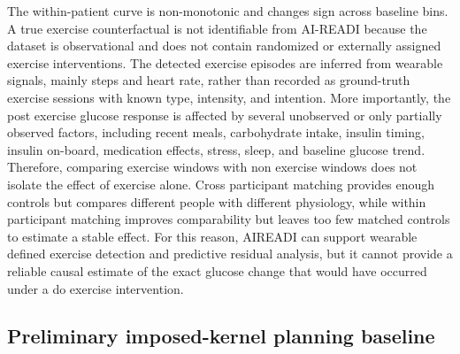 The within-patient curve is non-monotonic and changes sign across baseline
bins. A true exercise counterfactual is not identifiable from AI-READI because the dataset is observational and does not contain randomized or externally assigned exercise interventions. The detected exercise episodes are inferred from wearable signals, mainly steps and heart rate, rather than recorded as ground-truth exercise sessions with known type, intensity, and intention. More importantly, the post exercise glucose response is affected by several unobserved or only partially observed factors, including recent meals, carbohydrate intake, insulin timing, insulin on-board, medication effects, stress, sleep, and baseline glucose trend. Therefore, comparing exercise windows with non exercise windows does not isolate the effect of exercise alone. Cross participant matching provides enough controls but compares different people with different physiology, while within participant matching improves comparability but leaves too few matched controls to estimate a stable effect. For this reason, AIREADI can support wearable defined exercise detection and predictive residual analysis, but it cannot provide a reliable causal estimate of the exact glucose change that would have occurred under a do exercise  intervention.
\subsection{Preliminary imposed-kernel planning baseline}
\label{subsec:ex_pathb}

